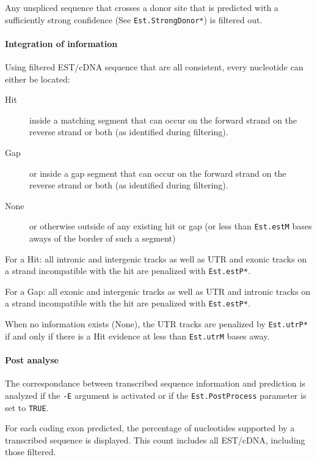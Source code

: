 Any unspliced sequence that crosses a donor site that is predicted
with a sufficiently strong confidence (See \texttt{Est.StrongDonor*})
is filtered out.

\paragraph{Integration of information}

Using filtered EST/cDNA sequence that are all consistent, every
nucleotide can either be located:
\begin{description}
\item[Hit] inside a matching segment that can occur on the forward strand
  on the reverse strand or both (as identified during filtering).
\item[Gap] or inside a gap segment that can occur on the forward strand
  on the reverse strand or both (as identified during filtering).
\item[None] or otherwise outside of any existing hit or gap (or less
  than \texttt{Est.estM} bases aways of the border of such a segment)
\end{description}

For a Hit: all intronic and intergenic tracks as well as UTR and
exonic tracks on a strand incompatible with the hit are penalized with
\texttt{Est.estP*}.

For a Gap: all exonic and intergenic tracks as well as UTR and
intronic tracks on a strand incompatible with the hit are penalized with
\texttt{Est.estP*}.

When no information exists (None), the UTR tracks are penalized by
\texttt{Est.utrP*} if and only if there is a Hit evidence at less than
\texttt{Est.utrM} bases away.

\paragraph{Post analyse}

The correspondance between transcribed sequence information and
prediction is analyzed if the \texttt{-E} argument
 is activated or if
the \texttt{Est.PostProcess} parameter is set to \texttt{TRUE}.

For each coding exon predicted, the percentage of nucleotides
supported by a transcribed sequence is displayed. This count includes
all EST/cDNA, including those filtered.

